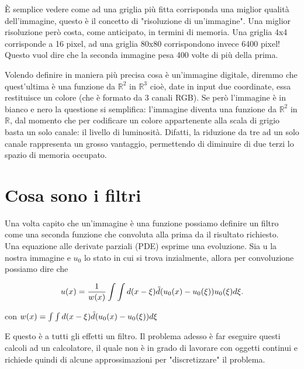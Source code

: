 \noindent
\`E semplice vedere come ad una griglia più fitta corrisponda una miglior qualità dell'immagine, questo è il concetto di "risoluzione di un'immagine". 
Una miglior risoluzione però costa, come anticipato, in termini di memoria. Una griglia 4x4 corrisponde a 16 pixel, ad una griglia 80x80 corrispondono invece 6400 pixel! Questo vuol dire che la seconda immagine pesa 400 volte di più della prima.

\vspace{1em} \noindent
Volendo definire in maniera più precisa cosa è un'immagine digitale, diremmo che quest'ultima è una funzione da $\mathbb R^2$ in $\mathbb R^3$ cioè, date in input due coordinate, essa restituisce un colore (che è formato da 3 canali RGB). Se però l'immagine è in bianco e nero la questione si semplifica: l'immagine diventa una funzione da $\mathbb R^2$ in $\mathbb R$, dal momento che per codificare un colore appartenente alla scala di grigio basta un solo canale: il livello di luminosità. Difatti, la riduzione da tre ad un solo canale rappresenta un grosso vantaggio, permettendo di diminuire di due terzi lo spazio di memoria occupato.

\section{Cosa sono i filtri}
Una volta capito che un'immagine è una funzione possiamo definire un filtro come una seconda funzione che convoluta alla prima da il risultato richiesto.\\
Una equazione alle derivate parziali (PDE) esprime una evoluzione. Sia u la nostra immagine e $u_0$ lo stato in cui si trova inzialmente, allora per convoluzione possiamo dire che 

\begin{equation} \label{eq:eq3}
u(x)=\frac{1}{w(x)}\int\int d(x-\xi)\Tilde{d}(u_0(x) -u_0(\xi))u_0(\xi)d\xi.
\end{equation}

\centering con  $w(x) = \int\int d(x-\xi)\Tilde{d}(u_0(x) -u_0(\xi))d\xi$\newline

\raggedright

E questo è a tutti gli effetti un filtro. Il problema adesso è far eseguire questi calcoli ad un calcolatore, il quale non è in grado di lavorare con oggetti continui e richiede quindi di alcune approssimazioni per "discretizzare" il problema.


